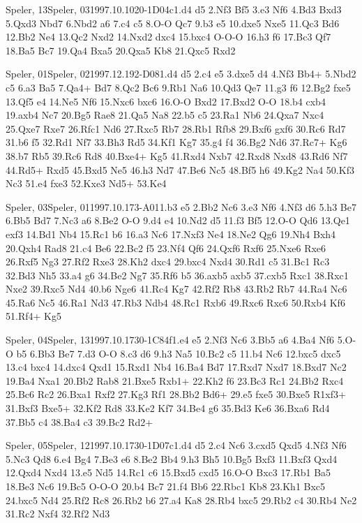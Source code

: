\documentclass[twocolumn,a4paper,10pt]{report}
\begin{document}
\begin{chessgame}{Speler, 13}{Speler, 03}{1997.10.10}{2}{0-1}{D04c}{1.d4 d5 2.Nf3 Bf5 3.e3 Nf6 4.Bd3 Bxd3 5.Qxd3 Nbd7 6.Nbd2 a6 7.c4 c5 8.O-O Qc7 9.b3 e5 10.dxe5 Nxe5 11.Qc3 Bd6 12.Bb2 Ne4 13.Qc2 Nxd2 14.Nxd2 dxc4 15.bxc4 O-O-O 16.h3 f6 17.Bc3 Qf7 18.Ba5 Bc7 19.Qa4 Bxa5 20.Qxa5 Kb8 21.Qxc5 Rxd2}\end{chessgame}
\begin{chessgame}{Speler, 01}{Speler, 02}{1997.12.19}{2}{\textonehalf-\textonehalf}{D08}{1.d4 d5 2.c4 e5 3.dxe5 d4 4.Nf3 Bb4+ 5.Nbd2 c5 6.a3 Ba5 7.Qa4+ Bd7 8.Qc2 Bc6 9.Rb1 Na6 10.Qd3 Qe7 11.g3 f6 12.Bg2 fxe5 13.Qf5 e4 14.Ne5 Nf6 15.Nxc6 bxc6 16.O-O Bxd2 17.Bxd2 O-O 18.b4 cxb4 19.axb4 Nc7 20.Bg5 Rae8 21.Qa5 Na8 22.b5 c5 23.Ra1 Nb6 24.Qxa7 Nxc4 25.Qxe7 Rxe7 26.Rfc1 Nd6 27.Rxc5 Rb7 28.Rb1 Rfb8 29.Bxf6 gxf6 30.Rc6 Rd7 31.b6 f5 32.Rd1 Nf7 33.Bh3 Rd5 34.Kf1 Kg7 35.g4 f4 36.Bg2 Nd6 37.Rc7+ Kg6 38.b7 Rb5 39.Rc6 Rd8 40.Bxe4+ Kg5 41.Rxd4 Nxb7 42.Rxd8 Nxd8 43.Rd6 Nf7 44.Rd5+ Rxd5 45.Bxd5 Ne5 46.h3 Nd7 47.Be6 Nc5 48.Bf5 h6 49.Kg2 Na4 50.Kf3 Nc3 51.e4 fxe3 52.Kxe3 Nd5+ 53.Ke4}\end{chessgame}
\begin{chessgame}{Speler, 03}{Speler, 01}{1997.10.17}{3}{\textonehalf-\textonehalf}{A01}{1.b3 e5 2.Bb2 Nc6 3.e3 Nf6 4.Nf3 d6 5.h3 Be7 6.Bb5 Bd7 7.Nc3 a6 8.Be2 O-O 9.d4 e4 10.Nd2 d5 11.f3 Bf5 12.O-O Qd6 13.Qe1 exf3 14.Bd1 Nb4 15.Rc1 b6 16.a3 Nc6 17.Nxf3 Ne4 18.Ne2 Qg6 19.Nh4 Bxh4 20.Qxh4 Rad8 21.c4 Be6 22.Bc2 f5 23.Nf4 Qf6 24.Qxf6 Rxf6 25.Nxe6 Rxe6 26.Rxf5 Ng3 27.Rf2 Rxe3 28.Kh2 dxc4 29.bxc4 Nxd4 30.Rd1 c5 31.Bc1 Rc3 32.Bd3 Nh5 33.a4 g6 34.Be2 Ng7 35.Rf6 b5 36.axb5 axb5 37.cxb5 Rxc1 38.Rxc1 Nxe2 39.Rxc5 Nd4 40.b6 Nge6 41.Rc4 Kg7 42.Rf2 Rb8 43.Rb2 Rb7 44.Ra4 Nc6 45.Ra6 Nc5 46.Ra1 Nd3 47.Rb3 Ndb4 48.Rc1 Rxb6 49.Rxc6 Rxc6 50.Rxb4 Kf6 51.Rf4+ Kg5}\end{chessgame}
\begin{chessgame}{Speler, 04}{Speler, 13}{1997.10.17}{3}{0-1}{C84f}{1.e4 e5 2.Nf3 Nc6 3.Bb5 a6 4.Ba4 Nf6 5.O-O b5 6.Bb3 Be7 7.d3 O-O 8.c3 d6 9.h3 Na5 10.Bc2 c5 11.b4 Nc6 12.bxc5 dxc5 13.c4 bxc4 14.dxc4 Qxd1 15.Rxd1 Nb4 16.Ba4 Bd7 17.Rxd7 Nxd7 18.Bxd7 Nc2 19.Ba4 Nxa1 20.Bb2 Rab8 21.Bxe5 Rxb1+ 22.Kh2 f6 23.Bc3 Rc1 24.Bb2 Rxc4 25.Bc6 Rc2 26.Bxa1 Rxf2 27.Kg3 Rf1 28.Bb2 Bd6+ 29.e5 fxe5 30.Bxe5 R1xf3+ 31.Bxf3 Bxe5+ 32.Kf2 Rd8 33.Ke2 Kf7 34.Be4 g6 35.Bd3 Ke6 36.Bxa6 Rd4 37.Bb5 c4 38.Ba4 c3 39.Bc2 Rd2+}\end{chessgame}
\begin{chessgame}{Speler, 05}{Speler, 12}{1997.10.17}{3}{0-1}{D07c}{1.d4 d5 2.c4 Nc6 3.cxd5 Qxd5 4.Nf3 Nf6 5.Nc3 Qd8 6.e4 Bg4 7.Be3 e6 8.Be2 Bb4 9.h3 Bh5 10.Bg5 Bxf3 11.Bxf3 Qxd4 12.Qxd4 Nxd4 13.e5 Nd5 14.Rc1 c6 15.Bxd5 cxd5 16.O-O Bxc3 17.Rb1 Ba5 18.Be3 Nc6 19.Bc5 O-O-O 20.b4 Bc7 21.f4 Bb6 22.Rbc1 Kb8 23.Kh1 Bxc5 24.bxc5 Nd4 25.Rf2 Rc8 26.Rb2 b6 27.a4 Ka8 28.Rb4 bxc5 29.Rb2 c4 30.Rb4 Ne2 31.Rc2 Nxf4 32.Rf2 Nd3}\end{chessgame}
\end{document}
